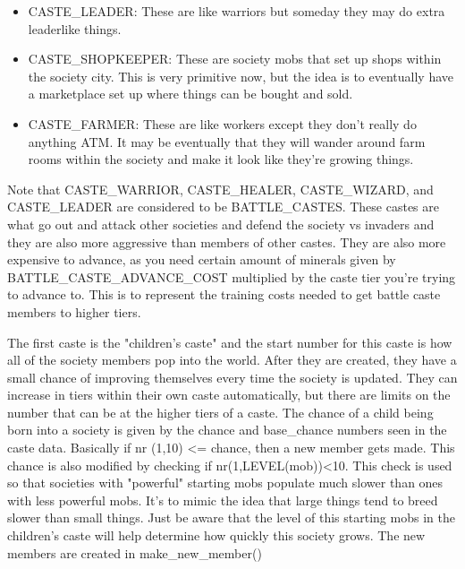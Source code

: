 \begin{itemize}
\item CASTE\_LEADER: These are like warriors but someday they may do
extra leaderlike things.

\item CASTE\_SHOPKEEPER: These are society mobs that set up shops within
the society city. This is very primitive now, but the idea is to 
eventually have a marketplace set up where things can be bought and sold.

\item CASTE\_FARMER: These are like workers except they don't really 
do anything ATM. It may be eventually that they will wander around
farm rooms within the society and make it look like they're growing
things.

\end{itemize}

Note that CASTE\_WARRIOR, CASTE\_HEALER, CASTE\_WIZARD, and CASTE\_LEADER
are considered to be BATTLE\_CASTES. These castes are what go out
and attack other societies and defend the society vs invaders and
they are also more aggressive than members of other castes. They
are also more expensive to advance, as you need  certain amount
of minerals given by BATTLE\_CASTE\_ADVANCE\_COST multiplied by the
caste tier you're trying to advance to. This is to represent the
training costs needed to get battle caste members to higher tiers.


The first caste is the "children's caste" and the start number for this
caste is how all of the society members pop into the world. After they
are created, they have a small chance of improving themselves every time
the society is updated. They can increase in tiers within their own caste
automatically, but there are limits on the number that can be at the
higher tiers of a caste. The chance of a child being born into a society
is given by the chance and base\_chance numbers seen in the caste
data. Basically if nr (1,10) <= chance, then a new member gets made. 
This chance is also modified by checking if nr(1,LEVEL(mob))<10. This
check is used so that societies with "powerful" starting mobs populate
much slower than ones with less powerful mobs. It's to mimic the idea
that large things tend to breed slower than small things. Just be
aware that the level of this starting mobs in the children's caste
will help determine how quickly this society grows. The new members
are created in make\_new\_member()


